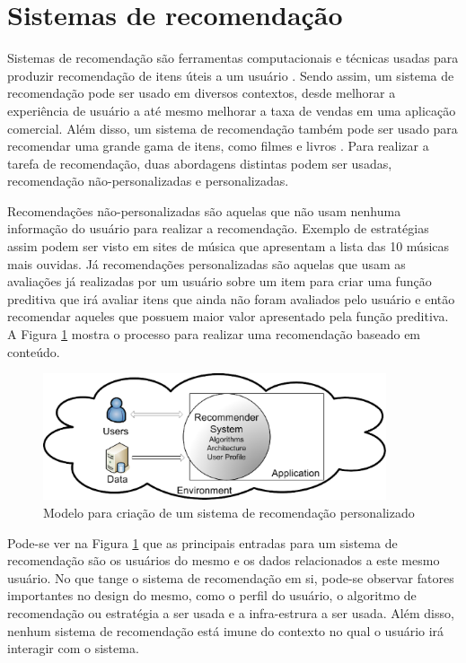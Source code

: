 \section{Sistemas de recomendação}

Sistemas de recomendação são ferramentas computacionais e técnicas usadas para
produzir recomendação de itens úteis a um usuário \cite{mahmood2009improving}.
Sendo assim, um sistema de recomendação pode ser usado em diversos contextos,
desde melhorar a experiência de usuário a até mesmo melhorar a taxa de vendas
em uma aplicação comercial. Além disso, um sistema de recomendação também pode
ser usado para recomendar uma grande gama de itens, como filmes e livros
\cite{ricci2011introduction}. Para realizar a tarefa de recomendação, duas abordagens distintas podem ser usadas,
recomendação não-personalizadas e personalizadas.

Recomendações não-personalizadas são aquelas que não usam nenhuma informação do
usuário para realizar a recomendação. Exemplo de estratégias assim podem ser
visto em sites de música que apresentam a lista das 10 músicas mais
ouvidas. Já recomendações personalizadas são aquelas que usam as avaliações já
realizadas por um usuário sobre um item para criar uma função preditiva que irá avaliar itens que ainda não foram
avaliados pelo usuário e então recomendar aqueles que possuem maior valor
apresentado pela função preditiva. A Figura \ref{fig:modelo_recomendacao} mostra
o processo para realizar uma recomendação baseado em conteúdo.

\begin{figure}[h]
  \centering
  \includegraphics[width=0.9\textwidth]{figuras/recommender_model.eps}
  \caption{Modelo para criação de um sistema de recomendação personalizado \cite{picault2011get}}
  \label{fig:modelo_recomendacao}
\end{figure}

Pode-se ver na Figura \ref{fig:modelo_recomendacao} que as principais entradas
para um sistema de recomendação são os usuários do mesmo e os dados relacionados
a este mesmo usuário. No que tange o sistema de recomendação em si, pode-se
observar fatores importantes no design do mesmo, como o perfil do usuário, o
algoritmo de recomendação ou estratégia a ser usada e a infra-estrura a ser
usada. Além disso, nenhum sistema de recomendação está imune do contexto no qual
o usuário irá interagir com o sistema.

